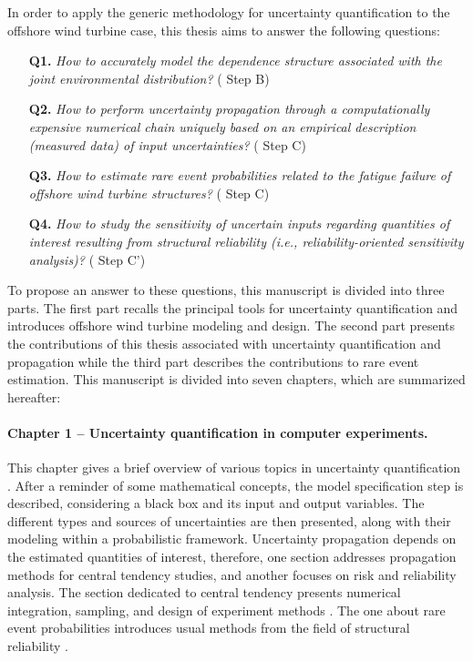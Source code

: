 In order to apply the generic methodology for uncertainty quantification to the offshore wind turbine case, this thesis aims to answer the following questions: 
\begin{itemize}
    \item[\textbf{Q1.}] \textit{
    How to accurately model the dependence structure associated with the joint environmental distribution? 
    } ( Step B)
    \item[\textbf{Q2.}] \textit{
    How to perform uncertainty propagation through a computationally expensive numerical chain uniquely based on an empirical description (measured data) of input uncertainties?
    } ( Step C)
    \item[\textbf{Q3.}] \textit{
    How to estimate rare event probabilities related to the fatigue failure of offshore wind turbine structures?
    } ( Step C)
    \item[\textbf{Q4.}] \textit{
    How to study the sensitivity of uncertain inputs regarding quantities of interest resulting from structural reliability (i.e., reliability-oriented sensitivity analysis)? 
    } ( Step C')
\end{itemize}

To propose an answer to these questions, this manuscript is divided into three parts. 
The first part recalls the principal tools for uncertainty quantification and introduces offshore wind turbine modeling and design. 
The second part presents the contributions of this thesis associated with uncertainty quantification and propagation while the third part describes the contributions to rare event estimation. 
This manuscript is divided into seven chapters, which are summarized hereafter: 

\paragraph{Chapter 1 -- Uncertainty quantification in computer experiments.} 
This chapter gives a brief overview of various topics in uncertainty quantification \citep{sullivan_2015}. 
After a reminder of some mathematical concepts, the model specification step is described, considering a black box and its input and output variables. 
The different types and sources of uncertainties are then presented, along with their modeling within a probabilistic framework. 
Uncertainty propagation depends on the estimated quantities of interest, therefore, one section addresses propagation methods for central tendency studies, and another focuses on risk and reliability analysis. 
The section dedicated to central tendency presents numerical integration, sampling, and design of experiment methods \citep{fang_liu_2018}. 
The one about rare event probabilities introduces usual methods from the field of structural reliability \citep{lemaire_2009,MorioBalesdent2015}. 

